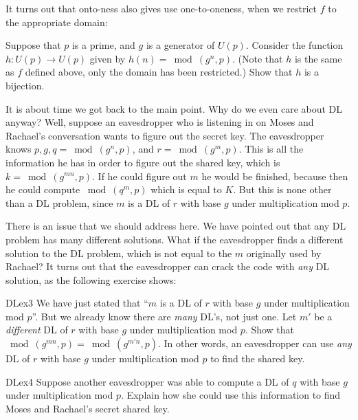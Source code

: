 It turns out that onto-ness also gives use one-to-oneness, when we restrict $f$ to the appropriate domain:

\begin{exercise}{} 
Suppose that $p$ is a prime, and $g$ is a generator of $U(p)$.  Consider the function $h: U(p) \rightarrow U(p)$ given by $h(n) = \bmod(g^n,p)$.  (Note that $h$ is the same as $f$ defined above, only the domain has been restricted.)  Show that $h$ is a bijection.
\end{exercise}

It is about time we got back to the main point. Why do we even care about DL anyway? Well, suppose an eavesdropper who is listening in on Moses and Rachael's conversation wants to figure out the secret key. 
The eavesdropper knows $p, g, q=\bmod(g^n,p)$, and $r=\bmod(g^m,p)$.  This is all the information he has in order to figure out the shared key, which is  $k=\bmod(g^{mn},p)$. If he could figure out $m$ he would be finished, because then he could compute $\bmod(q^m,p)$ which is equal to $K$. But this is none other than a DL problem, since $m$ is a DL of $r$ with base $g$ under multiplication mod $p$.  

There is an issue that we should address here. We have pointed out that any DL problem has many different solutions. What if the eavesdropper finds a different solution to the DL problem, which is not equal to the $m$ originally used by Rachael? It turns out that the eavesdropper can crack the code with \emph{any} DL solution, as the following exercise shows:

\begin{exercise}{DLex3}
We have just stated that ``$m$ is a DL of $r$ with base $g$ under multiplication mod $p$''.  But we already know there are \emph{many} DL's, not just one. Let $m'$ be a \emph{different} DL of $r$ with base $g$ under multiplication mod $p$. Show that $\bmod(g^{mn},p)=\bmod(g^{m'n},p)$. In other words, an eavesdropper can use \emph{any} DL of $r$ with base $g$ under multiplication mod $p$ to find the shared key.
\end{exercise}

\begin{exercise}{DLex4}
Suppose another eavesdropper was able to compute a DL of $q$ with base $g$ under multiplication mod $p$.  Explain how she could use this information to find Moses and Rachael's secret shared key.
\end{exercise}

